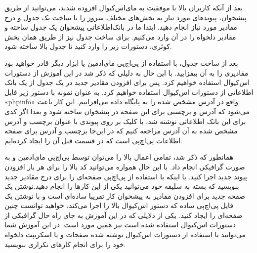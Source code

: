 \begin{latin}  
    
\end{latin}

بعد از آنکه کاربران بالا با موفقیت به مای‌اس‌کیوال افزوده شدند، می‌توانید از طریق پیشخوان، پیوندهای مورد نیاز به بخش‌های مختلف سرور را با ساخت یک جدول و درج مقادیر مورد نیاز انجام دهید. ابتدا ما در بانک‌اطلاعاتی پیشخوان یک جدول ساخته و مقادیر دلخواه را در آن وارد می‌کنیم. برای ساخت جدول نیز از طریق همان بخش کوئری، دستورات زیر را وارد کنید تا جدول بالا ساخته شود.
\newline

\begin{latin}  
    
\end{latin}

بعد از ساخت جدول، با استفاده از پی‌اچ‌پی مای‌ادمین یا ابزار دیگر قادر خواهید بود مقادیری را به آن بیفزایید. با این حال به دلیلی که ذکر شد در این آموزش از دستورات اس‌کیوال استفاده خواهیم کرد. پس برای افزودن مقادیر جدید در یک جدول از یک بانک اطلاعاتی از دستورات اس‌کیوال استفاده خواهیم کرد. به عنوان نمونه  با دستور زیر فایل «phpinfo» واقع در آدرس مشخص شده را به پایگاه داده می‌افزاییم. این کار باعث می‌شود که آدرس و برچسبی برای این صفحه در پیشخوان ساخته شود و بعدا اگر کدی برای این بانک اطلاعاتی نوشته شد، با کلیک بر روی پیوندی با عنوان برچسب و آدرس مشخص شده به آن آدرس مراجعه کنیم که در این‌جا برچسب و آدرس برای صفحه اطلاعات پی‌اچ‌پی است که در قسمت قبل آن را ایجاد کرده‌ایم.
\newpage


\begin{latin}  
    
\end{latin}

همانطور که ذکر شد، تمامی اعمال بالا را می‌توان توسط پی‌اچ‌پی مای‌ادمین و به صورت گرافیکی انجام داد. با این حال همواره می‌توانید کد بالا را برای هر بار افزودن پیوند جدید اجرا کنید. یا اینکه  با استفاده از پی‌اچ‌پی صفحه‌ای را برای درج مقادیر جدید بنویسید که بسته به سلیقه خود می‌توانید یکی از این کارها را انجام دهید.نوشتن یک صفحه جدید برای افزودن مقادیر به پیشخوان کار تقریبا ساده‌ای است و با نوشتن یک فایل پی‌اچ‌پی ساده که دستور اس‌کیوال بالا را اجرا می‌کند، خواهید توانست چنین صفحه‌ای را ایجاد کنید. یکی از دلایلی که در این آموزش به جای راه حال گرافیکی از دستورات اس‌کیوال استفاده شده است نیز همین مورد است. در این آموزش شما می‌توانید با استفاده از دستورات اس‌کیوال نوشته شده صفحات و یا اسکریپت دلخواه خود را برای انجام کارهای تکراری بنویسید.
